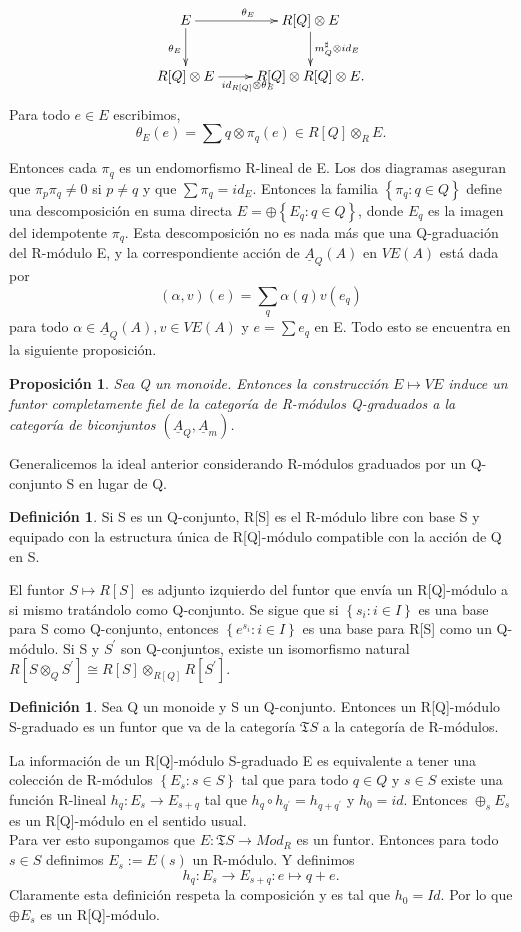 \documentclass[12pt,spanish]{amsart}
\newcommand{\fk}[1]{\mathfrak{#1}}
\newcommand{\set}[1]{\left\{{#1}\right\}}
\newtheorem{prop}[Theorem]{Proposición}
\theoremstyle{definition}
\newtheorem{Def}[Theorem]{Definición}
\theoremstyle{remark}
\begin{document}
$$\xymatrix{
E \ar[d]_{\theta_{E}} \ar[r]^{\theta_{E}} & R[Q] \otimes E \ar[d]^{m_{Q}^{\sharp} \otimes id_{E}} \\
R[Q] \otimes E \ar[r]_{id_{R[Q]} \otimes \theta_{E}} & R[Q]\otimes R[Q] \otimes E.
}$$
Para todo $e\in E$ escribimos,
$$\theta_{E}(e)=\sum q\otimes \pi_{q} (e) \in R[Q] \otimes_{R} E.$$
 
Entonces cada $\pi_{q}$ es un endomorfismo R-lineal de E. Los dos diagramas aseguran que $\pi_{p} \pi_{q} \neq 0$ si $p\neq q$ y que $\sum \pi_{q}= id_{E}$. Entonces la familia $\set{\pi_{q}:q\in Q}$ define una descomposición en suma directa $E = \oplus \set{E_{q}:q\in Q}$, donde $E_{q}$ es la imagen del idempotente $\pi_{q}$. Esta descomposición no es nada más que una Q-graduación del R-módulo E, y la correspondiente acción de $\underline{A}_{Q}(A)$ en $VE(A)$ está dada por 
$$(\alpha,v)(e)= \sum_{q} \alpha(q)v(e_{q}) $$
para todo $\alpha \in \underline{A}_{Q}(A),v \in VE(A)$ y $e= \sum e_{q}$ en E. Todo esto se encuentra en la siguiente proposición.

\begin{prop}
 Sea Q un monoide. Entonces la construcción $E \mapsto VE$ induce un funtor completamente fiel de la categoría de R-módulos Q-graduados a la categoría de biconjuntos $(\underline{A}_{Q},\underline{A}_{m})$. 
\end{prop}


Generalicemos la ideal anterior considerando R-módulos graduados por un Q-conjunto S en lugar de Q. 

\begin{Def}
Si S es un Q-conjunto, R[S] es el R-módulo libre con base S y equipado con la estructura única de R[Q]-módulo compatible con la acción de Q en S. 
\end{Def}

El funtor $S \mapsto R[S]$ es adjunto izquierdo del funtor que envía un R[Q]-módulo a si mismo tratándolo como Q-conjunto. Se sigue que si $\set{s_{i}:i\in I}$ es una base para S como Q-conjunto, entonces $\set{e^{s_{i}}:i\in I}$ es una base para R[S] como un Q-módulo. Si S y $S^{\prime}$ son Q-conjuntos, existe un isomorfismo natural $R[S\otimes_{Q} S^{\prime}] \cong R[S] \otimes_{R[Q]} R[S^{\prime}]$. 
\begin{Def}
Sea Q un monoide y S un Q-conjunto. Entonces un R[Q]-módulo S-graduado es un funtor que va de la categoría $\fk{T}S$ a la categoría de R-módulos.  
\end{Def}

La información de un R[Q]-módulo S-graduado E es equivalente a tener una colección de R-módulos $\set{E_{s}:s\in S}$ tal que para todo $q\in Q$ y $s\in S$ existe una función R-lineal $h_{q}:E_{s} \to E_{s+q}$ tal que $h_{q} \circ h_{q^{\prime}}=h_{q+q^{\prime}}$ y $h_{0}=id$. Entonces $\oplus_{s} E_{s}$ es un R[Q]-módulo en el sentido usual. \\ 
Para ver esto supongamos que $E:\fk{T}S \to Mod_{R}$ es un funtor. Entonces para todo $s\in S$ definimos $E_{s}:=E(s)$ un R-módulo. Y definimos 
$$h_{q}:E_{s} \to E_{s+q}:e \mapsto q+e.$$
Claramente esta definición respeta la composición y es tal que $h_{0}=Id.$ Por lo que $\oplus E_{s}$ es un R[Q]-módulo.  
\end{document}
